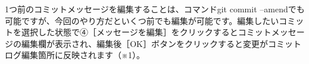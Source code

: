 \documentclass{jsarticle}
\begin{document}
1つ前のコミットメッセージを編集することは、コマンドgit commit --amendでも可能ですが、今回のやり方だといくつ前でも編集が可能です。編集したいコミットを選択した状態で④［メッセージを編集］をクリックするとコミットメッセージの編集欄が表示され、編集後［OK］ボタンをクリックすると変更がコミットログ編集箇所に反映されます（※1）。
\end{document}
